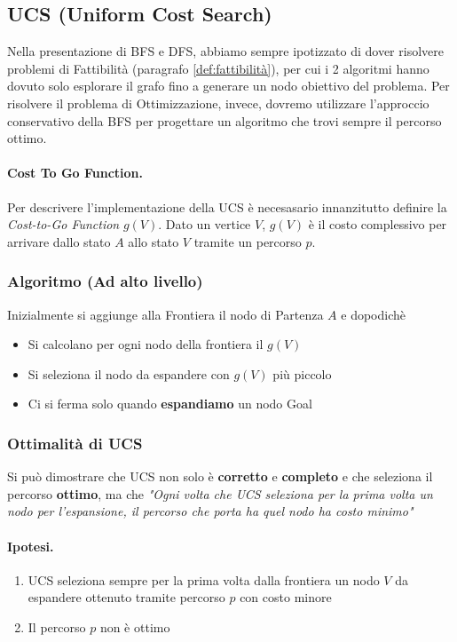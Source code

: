 \subsection{UCS (Uniform Cost Search)}
Nella presentazione di BFS e DFS, abbiamo sempre ipotizzato di dover risolvere problemi di Fattibilità (paragrafo \ref{def:fattibilità}),
per cui i 2 algoritmi hanno dovuto solo esplorare il grafo fino a generare un nodo obiettivo del problema.
Per risolvere il problema di Ottimizzazione, invece, dovremo utilizzare l'approccio conservativo della BFS per progettare 
un algoritmo che trovi sempre il percorso ottimo.\\

\paragraph{Cost To Go Function. }
Per descrivere l'implementazione della UCS è necesasario innanzitutto definire la \textit{Cost-to-Go Function} $g(V)$.
Dato un vertice $V$, $g(V)$ è il costo complessivo per arrivare dallo stato $A$ allo stato $V$ tramite un percorso $p$.

\subsubsection{Algoritmo (Ad alto livello)}
Inizialmente si aggiunge alla Frontiera il nodo di Partenza $A$ e dopodichè
\begin{itemize}
    \item Si calcolano per ogni nodo della frontiera il $g(V)$
    \item Si seleziona il nodo da espandere con $g(V)$ più piccolo
    \item Ci si ferma solo quando \textbf{espandiamo} un nodo Goal
\end{itemize}

\newpage

\subsubsection{Ottimalità di UCS}
Si può dimostrare che UCS non solo è \textbf{corretto} e \textbf{completo} e che seleziona il percorso \textbf{ottimo}, ma che
\textit{"Ogni volta che UCS seleziona per la prima volta un nodo per l'espansione, il percorso che porta ha quel nodo ha costo minimo"}

\paragraph{Ipotesi. }
\begin{enumerate}
    \item UCS seleziona sempre per la prima volta dalla frontiera un nodo $V$ da espandere ottenuto tramite percorso $p$ con costo minore
    \item Il percorso $p$ non è ottimo
\end{enumerate}

